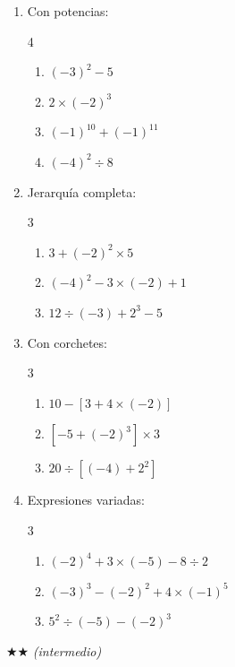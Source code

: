 \documentclass[11pt, letterpaper]{article}
\begin{document}
\begin{enumerate}[label=\textbf{\arabic*.}, leftmargin=*]
  \item Con potencias:
  \begin{multicols}{4}
  \begin{enumerate}[label=\alph*)]
    \item $(-3)^2-5$
    \item $2\times(-2)^3$
    \item $(-1)^{10}+(-1)^{11}$
    \item $(-4)^2\div 8$
  \end{enumerate}
  \end{multicols}

  \item Jerarqu\'ia completa:
  \begin{multicols}{3}
  \begin{enumerate}[label=\alph*)]
    \item $3+(-2)^2\times 5$
    \item $(-4)^2-3\times(-2)+1$
    \item $12\div(-3)+2^3-5$
  \end{enumerate}
  \end{multicols}

  \item Con corchetes:
  \begin{multicols}{3}
  \begin{enumerate}[label=\alph*)]
    \item $10-[3+4\times(-2)]$
    \item $[-5+(-2)^3]\times 3$
    \item $20\div[(-4)+2^2]$
  \end{enumerate}
  \end{multicols}

  \item Expresiones variadas:
  \begin{multicols}{3}
  \begin{enumerate}[label=\alph*)]
    \item $(-2)^4+3\times(-5)-8\div 2$
    \item $(-3)^3-(-2)^2+4\times(-1)^5$
    \item $5^2\div(-5)-(-2)^3$
  \end{enumerate}
  \end{multicols}
\end{enumerate}

$\bigstar\bigstar$ \textit{(intermedio)}
\end{document}
